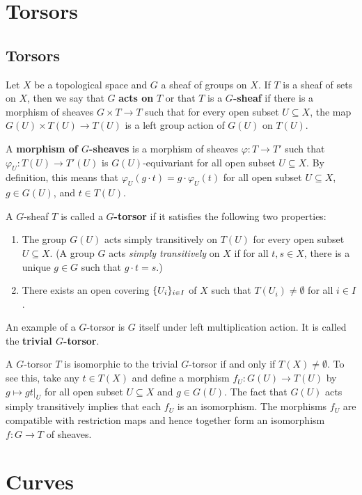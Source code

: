 \documentclass[12pt]{book}
\newcommand{\inlinedef}[1]{\textcolor{oxfordblue}{\bfseries #1}}
\theoremstyle{definition}
\DeclarePairedDelimiter{\Set}{\lbrace}{\rbrace}
\begin{document}
	\chapter{Torsors}
	
	\section{Torsors}
	Let $X$ be a topological space and $G$ a sheaf of groups on $X$. If $T$ is a sheaf of sets on $X$, then we say that $G$ \inlinedef{acts on} $T$ or that $T$ is a \inlinedef{$G$-sheaf} if there is a morphism of sheaves $G \times T \to T$ such that for every open subset $U \subseteq X$, the map $G(U) \times T(U) \to T(U)$ is a left group action of $G(U)$ on $T(U)$.
	
	A \inlinedef{morphism of $G$-sheaves} is a morphism of sheaves $\varphi\colon T \to T'$ such that $\varphi_U \colon T(U) \to T'(U)$ is $G(U)$-equivariant for all open subset $U \subseteq X$. By definition, this means that $\varphi_U(g\cdot t) = g\cdot \varphi_U(t)$ for all open subset $U \subseteq X$, $g \in G(U)$, and $t\in T(U)$.
	
	\begin{definition}
		A $G$-sheaf $T$ is called a \inlinedef{$G$-torsor} if it satisfies the following two properties:
		\begin{enumerate}
			\item The group $G(U)$ acts simply transitively on $T(U)$ for every open subset $U \subseteq X$. (A group $G$ acts \textit{simply transitively} on $X$ if for all $t, s \in X$, there is a unique $g \in G$ such that $g\cdot t = s$.)
			
			\item There exists an open covering $\Set{U_i}_{i \in I}$ of $X$ such that $T(U_i) \neq \emptyset$ for all $i\in I$.
		\end{enumerate}
	\end{definition}
	
	An example of a $G$-torsor is $G$ itself under left multiplication action. It is called the \inlinedef{trivial $G$-torsor}. 
	
	\begin{remark}
		A $G$-torsor $T$ is isomorphic to the trivial $G$-torsor if and only if $T(X) \neq \emptyset$. To see this, take any $t \in T(X)$ and define a morphism $f_U \colon G(U) \to T(U)$ by $g \mapsto gt|_U$ for all open subset $U \subseteq X$ and $g \in G(U)$. The fact that $G(U)$ acts simply transitively implies that each $f_U$ is an isomorphism. The morphisms $f_U$ are compatible with restriction maps and hence together form an isomorphism $f \colon G \to T$ of sheaves.
	\end{remark}
	
	\chapter{Curves}
	
	
	
	
\end{document}

